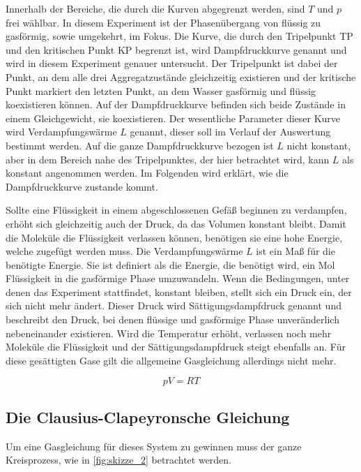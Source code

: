 Innerhalb der Bereiche, die durch die Kurven abgegrenzt werden, sind $T$ und $p$ frei wählbar.
In diesem Experiment ist der Phasenübergang von flüssig zu gasförmig, sowie umgekehrt, im Fokus.
Die Kurve, die durch den Tripelpunkt TP und den kritischen Punkt KP begrenzt ist, wird Dampfdruckkurve genannt und wird in diesem Experiment genauer untersucht.
Der Tripelpunkt ist dabei der Punkt, an dem alle drei Aggregatzustände gleichzeitig existieren und der kritische Punkt markiert den letzten Punkt, an dem Wasser gasförmig und flüssig koexistieren können. 
Auf der Dampfdruckkurve befinden sich beide Zustände in einem Gleichgewicht, sie koexistieren.
Der wesentliche Parameter dieser Kurve wird Verdampfungswärme $L$ genannt, dieser soll im Verlauf der Auswertung bestimmt werden.
Auf die ganze Dampfdruckkurve bezogen ist $L$ nicht konstant, aber in dem Bereich nahe des Tripelpunktes, der hier betrachtet wird, kann $L$ als konstant angenommen werden.
Im Folgenden wird erklärt, wie die Dampfdruckkurve zustande kommt.

Sollte eine Flüssigkeit in einem abgeschlossenen Gefäß beginnen zu verdampfen, erhöht sich gleichzeitig auch der Druck, da das Volumen konstant bleibt.
Damit die Moleküle die Flüssigkeit verlassen können, benötigen sie eine hohe Energie, welche zugefügt werden muss.
Die Verdampfungswärme $L$ ist ein Maß für die benötigte Energie.
Sie ist definiert als die Energie, die benötigt wird, ein Mol Flüssigkeit in die gasförmige Phase umzuwandeln.
Wenn die Bedingungen, unter denen das Experiment stattfindet, konstant bleiben, stellt sich ein Druck ein, der sich nicht mehr ändert.
Dieser Druck wird Sättigungsdampfdruck genannt und beschreibt den Druck, bei denen flüssige und gasförmige Phase unveränderlich nebeneinander existieren.
Wird die Temperatur erhöht, verlassen noch mehr Moleküle die Flüssigkeit und der Sättigungsdampfdruck steigt ebenfalls an.
Für diese gesättigten Gase gilt die allgemeine Gasgleichung allerdings nicht mehr.

\begin{equation}
    pV = RT
    \label{eq:gas:gl}
\end{equation}

\subsection{Die Clausius-Clapeyronsche Gleichung}
\label{ssec:b}

Um eine Gasgleichung für dieses System zu gewinnen muss der ganze Kreisprozess, wie in \autoref{fig:skizze_2} betrachtet werden.

